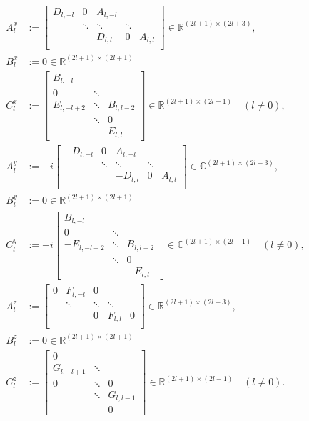 \documentclass[11pt, oneside]{article}   	%
\newcommand{\R}{\mathbb{R}}
\newcommand{\C}{\mathbb{C}}
\begin{document}
\begin{align}
A^x_l &:= \begin{bmatrix}
		D_{l,-l} & 0 & A_{l,-l} & & \\
		& \ddots & \ddots & \ddots & \\
		& & D_{l,l} & 0 & A_{l,l} \\
	    \end{bmatrix} \in \R^{(2l+1)\times(2l+3)}, \\
B^x_l &:= 0 \in \R^{(2l+1)\times(2l+1)} \\
C^x_l &:= \begin{bmatrix}
		B_{l,-l} & & \\
		0 & \ddots & \\
		E_{l,-l+2} & \ddots & B_{l,l-2} \\
		& \ddots & 0 \\
		& & E_{l,l}
	    \end{bmatrix} \in \R^{(2l+1)\times(2l-1)} \quad (l \ne 0), \\
A^y_l &:= -i \begin{bmatrix}
		-D_{l,-l} & 0 & A_{l,-l} & & \\
		& \ddots & \ddots & \ddots & \\
		& & -D_{l,l} & 0 & A_{l,l} \\
	    \end{bmatrix} \in \C^{(2l+1)\times(2l+3)}, \\
B^y_l &:= 0 \in \R^{(2l+1)\times(2l+1)} \\
C^y_l &:= -i \begin{bmatrix}
		B_{l,-l} & & \\
		0 & \ddots & \\
		-E_{l,-l+2} & \ddots & B_{l,l-2} \\
		& \ddots & 0 \\
		& & -E_{l,l}
	    \end{bmatrix} \in \C^{(2l+1)\times(2l-1)} \quad (l \ne 0), \\
A^z_l &:= \begin{bmatrix}
		0 & F_{l,-l} & 0 & & \\
		& \ddots & \ddots & \ddots & \\
		& & 0 & F_{l,l} & 0 \\
	    \end{bmatrix} \in \R^{(2l+1)\times(2l+3)}, \\
B^z_l &:= 0 \in \R^{(2l+1)\times(2l+1)} \\
C^z_l &:= \begin{bmatrix}
		0 & & \\
		G_{l,-l+1} & \ddots & \\
		0 & \ddots & 0 \\
		& \ddots & G_{l,l-1} \\
		& & 0
	    \end{bmatrix} \in \R^{(2l+1)\times(2l-1)} \quad (l \ne 0). \\
\end{align}
\end{document}
